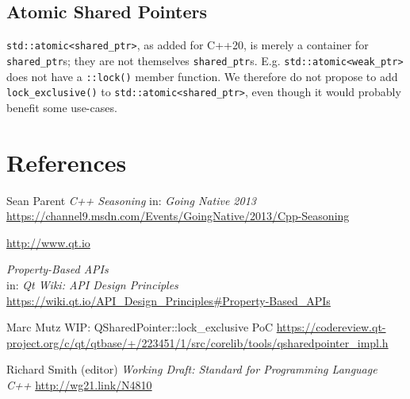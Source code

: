 \documentclass[11pt]{article}
\newcommand{\lockx}{\texttt{lock\_exclusive()}}
\newcommand{\sptr}{\texttt{shared\_ptr}}
\begin{document}
\subsection{Atomic Shared Pointers}

\texttt{std::atomic<shared\_ptr>}, as added for C++20, is merely
a container for \sptr{}s; they are not themselves
\sptr{}s. E.g. \texttt{std::atomic<weak\_ptr>} does not have a
\texttt{::lock()} member function. We therefore do not propose to add
\lockx{} to \texttt{std::atomic<shared\_ptr>}, even though it would
probably benefit some use-cases.

\iffalse
\section{Acknowledgements}
\fi

\section{References}
\renewcommand{\section}[2]{}%
\begin{thebibliography}{9}
  Sean Parent\newline
  \emph{C++ Seasoning}\newline
  in: \emph{Going Native 2013}\newline
  \url{https://channel9.msdn.com/Events/GoingNative/2013/Cpp-Seasoning}

  \url{http://www.qt.io}

  \emph{Property-Based APIs}\\
  in: \emph{Qt Wiki: API Design Principles}\\
  \url{https://wiki.qt.io/API_Design_Principles#Property-Based_APIs}

  Marc Mutz\newline
  WIP: QSharedPointer::lock\_exclusive PoC\newline
  \url{https://codereview.qt-project.org/c/qt/qtbase/+/223451/1/src/corelib/tools/qsharedpointer_impl.h}
  
  Richard Smith (editor)\newline
  \emph{Working Draft: Standard for Programming Language C++}\newline
  \url{http://wg21.link/N4810}
\end{thebibliography}
\end{document}
